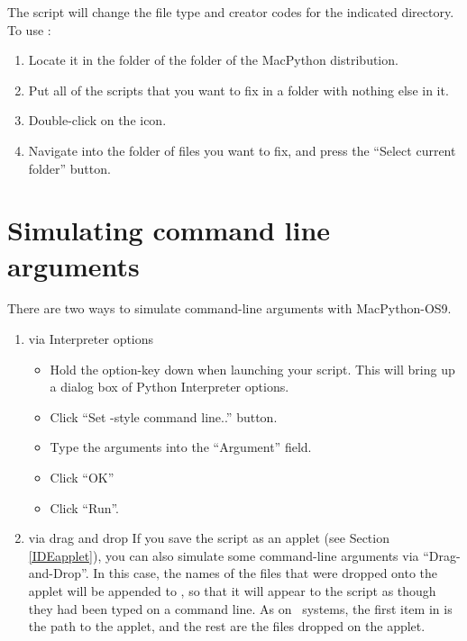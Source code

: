 The  script will change the file type and
creator codes for the indicated directory.  To use
:

\begin{enumerate}
\item
Locate it in the  folder of the  folder of the
MacPython distribution.

\item
Put all of the scripts that you want to fix in a folder with nothing
else in it.

\item
Double-click on the  icon.

\item
Navigate into the folder of files you want to fix, and press the
``Select current folder'' button.
\end{enumerate}


\section{Simulating command line arguments
         \label{argv}}

There are two ways to simulate command-line arguments with MacPython-OS9.
 
\begin{enumerate}
\item via Interpreter options
\begin{itemize} %
  \item Hold the option-key down when launching your script. This will
        bring up a dialog box of Python Interpreter options.
  \item Click ``Set \UNIX-style command line..'' button. 
  \item Type the arguments into the ``Argument'' field.
  \item Click ``OK''
  \item Click ``Run''.
\end{itemize} %

\item via drag and drop
If you save the script as an applet (see Section \ref{IDEapplet}), you
can also simulate some command-line arguments via
``Drag-and-Drop''. In this case, the names of the files that were
dropped onto the applet will be appended to , so that
it will appear to the script as though they had been typed on a
command line.  As on \UNIX\ systems, the first item in  is
the path to the applet, and the rest are the files dropped on the
applet.
\end{enumerate}


